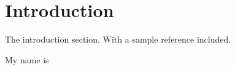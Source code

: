 
\section{Introduction} %
\label{sec:introduction}
	The introduction section.
    With a sample reference \citep{cranny2016sample} included.

    My name is \myname{}
